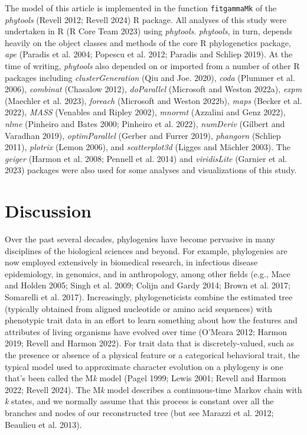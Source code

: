 \documentclass[fleqn,10pt,lineno]{wlpeerj} %
\begin{document}
The model of this article is implemented in the function \texttt{fitgammaMk} of the \emph{phytools} (Revell 2012; Revell 2024) R package. All analyses of this study were undertaken in R (R Core Team 2023) using \emph{phytools}. \emph{phytools}, in turn, depends heavily on the object classes and methods of the core R phylogenetics package, \emph{ape} (Paradis et al. 2004; Popescu et al. 2012; Paradis and Schliep 2019). At the time of writing, \emph{phytools} also depended on or imported from a number of other R packages including \emph{clusterGeneration} (Qiu and Joe. 2020), \emph{coda} (Plummer et al. 2006), \emph{combinat} (Chasalow 2012), \emph{doParallel} (Microsoft and Weston 2022a), \emph{expm} (Maechler et al. 2023), \emph{foreach} (Microsoft and Weston 2022b), \emph{maps} (Becker et al. 2022), \emph{MASS} (Venables and Ripley 2002), \emph{mnormt} (Azzalini and Genz 2022), \emph{nlme} (Pinheiro and Bates 2000; Pinheiro et al. 2022), \emph{numDeriv} (Gilbert and Varadhan 2019), \emph{optimParallel} (Gerber and Furrer 2019), \emph{phangorn} (Schliep 2011), \emph{plotrix} (Lemon 2006), and \emph{scatterplot3d} (Ligges and Mächler 2003). The \emph{geiger} (Harmon et al. 2008; Pennell et al. 2014) and \emph{viridisLite} (Garnier et al. 2023) packages were also used for some analyses and visualizations of this study.

\section{Discussion}\label{discussion}

Over the past several decades, phylogenies have become pervasive in many disciplines of the biological sciences and beyond. For example, phylogenies are now employed extensively in biomedical research, in infectious disease epidemiology, in genomics, and in anthropology, among other fields (e.g., Mace and Holden 2005; Singh et al. 2009; Colijn and Gardy 2014; Brown et al. 2017; Somarelli et al. 2017). Increasingly, phylogeneticists combine the estimated tree (typically obtained from aligned nucleotide or amino acid sequences) with phenotypic trait data in an effort to learn something about how the features and attributes of living organisms have evolved over time (O'Meara 2012; Harmon 2019; Revell and Harmon 2022). For trait data that is discretely-valued, such as the presence or absence of a physical feature or a categorical behavioral trait, the typical model used to approximate character evolution on a phylogeny is one that's been called the M\emph{k} model (Pagel 1999; Lewis 2001; Revell and Harmon 2022; Revell 2024). The M\emph{k} model describes a continuous-time Markov chain with \emph{k} states, and we normally assume that this process is constant over all the branches and nodes of our reconstructed tree (but see Marazzi et al. 2012; Beaulieu et al. 2013).
\end{document}
